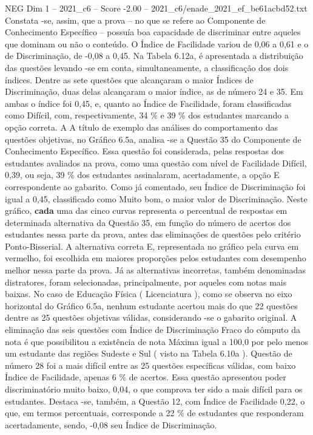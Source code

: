 \begin{textsample}{NEG Dim 1 – 2021\_c6 – Score -2.00 – 2021\_c6/enade\_2021\_ef\_be61acbd52.txt}
Constata -se, assim, que a prova – no que se refere ao Componente de Conhecimento Específico – possuía boa capacidade de discriminar entre aqueles que dominam ou não o conteúdo.
O Índice de Facilidade variou de 0,06 a 0,61 e o de Discriminação, de -0,08 a 0,45.
Na Tabela 6.12a, é apresentada a distribuição das questões levando -se em conta, simultaneamente, a classificação dos dois índices.
Dentre as sete questões que alcançaram o maior Índices de Discriminação, duas delas alcançaram o maior índice, as de número 24 e 35.
Em ambas o índice foi 0,45, e, quanto ao Índice de Facilidade, foram classificadas como Difícil, com, respectivamente, 34 \% e 39 \% dos estudantes marcando a opção correta.
A A título de exemplo das análises do comportamento das questões objetivas, no Gráfico 6.5a, analisa -se a Questão 35 do Componente de Conhecimento Específico.
Essa questão foi considerada, pelas respostas dos estudantes avaliados na prova, como uma questão com nível de Facilidade Difícil, 0,39, ou seja, 39 \% dos estudantes assinalaram, acertadamente, a opção E correspondente ao gabarito.
Como já comentado, seu Índice de Discriminação foi igual a 0,45, classificado como Muito bom, o maior valor de Discriminação.
Neste gráfico, \textbf{cada} uma das cinco curvas representa o percentual de respostas em determinada alternativa da Questão 35, em função do número de acertos dos estudantes nessa parte da prova, antes das eliminações de questões pelo critério Ponto-Bisserial.
A alternativa correta E, representada no gráfico pela curva em vermelho, foi escolhida em maiores proporções pelos estudantes com desempenho melhor nessa parte da prova.
Já as alternativas incorretas, também denominadas distratores, foram selecionadas, principalmente, por aqueles com notas mais baixas.
No caso de Educação Física ( Licenciatura ), como se observa no eixo horizontal do Gráfico 6.5a, nenhum estudante acertou mais do que 22 questões dentre as 25 questões objetivas válidas, considerando -se o gabarito original.
A eliminação das seis questões com Índice de Discriminação Fraco do cômputo da nota é que possibilitou a existência de nota Máxima igual a 100,0 por pelo menos um estudante das regiões Sudeste e Sul ( visto na Tabela 6.10a ).
Questão de número 28 foi a mais difícil entre as 25 questões específicas válidas, com baixo Índice de Facilidade, apenas 6 \% de acertos.
Essa questão apresentou poder discriminatório muito baixo, 0,04, o que comprova ter sido a mais difícil para os estudantes.
Destaca -se, também, a Questão 12, com Índice de Facilidade 0,22, o que, em termos percentuais, corresponde a 22 \% de estudantes que responderam acertadamente, sendo, -0,08 seu Índice de Discriminação.

\end{textsample}
